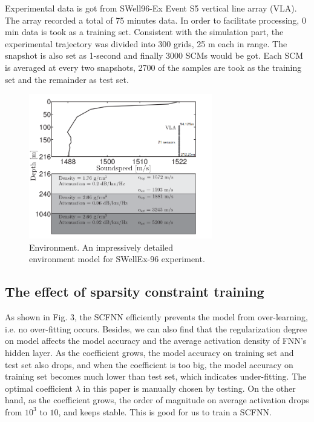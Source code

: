 Experimental data is got from SWell96-Ex Event S5 vertical line array (VLA). The array recorded a total of 75 minutes data. In order to facilitate processing, 0 min data is took as a training set.
Consistent with the simulation part, the experimental trajectory was divided into 300 grids, 25 m each in range. The snapshot is also set as 1-second and finally 3000 SCMs would be got. Each SCM is averaged at every two snapshots, 2700 of the samples are took as the training set and the remainder as test set.
\begin{figure}
\includegraphics[width=8cm]{figure/environment}
\caption{Environment. An impressively detailed \\environment model for SWellEx-96 experiment.}
\end{figure}
\subsection{The effect of sparsity constraint training}
As shown in Fig. 3, the SCFNN efficiently prevents the model from over-learning, i.e. no over-fitting occurs.
Besides, we can also find that the regularization degree on model affects the model accuracy and the average activation density of FNN's hidden layer. As the coefficient grows, the model accuracy on training set and test set also drops,
and when the coefficient is too big, the model accuracy on training set becomes much lower than test set, which indicates under-fitting.
The optimal coefficient $\lambda$ in this paper is manually chosen by testing.
On the other hand, as the coefficient grows, the order of magnitude on average activation drops from $10^{3}$ to $10$, and keeps stable. This is good for us to train a SCFNN.

